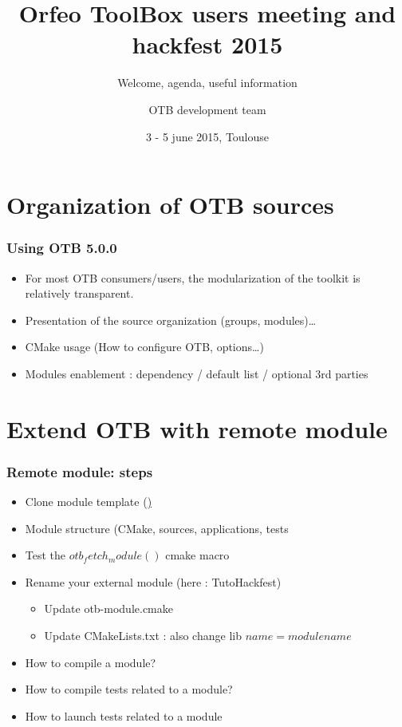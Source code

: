\documentclass[8pt]{beamer}
\title{Orfeo ToolBox users meeting and hackfest 2015}
\subtitle{Welcome, agenda, useful information}
\author{OTB development team}%
\date{3 - 5 june 2015, Toulouse}
\begin{document}
\begin{frame}
\titlepage
\end{frame}

\section{Organization of OTB sources} 
\begin{frame}
\frametitle{Using OTB 5.0.0}

\begin{itemize}
\item For most OTB consumers/users, the modularization of the toolkit is relatively transparent. 
\item Presentation of the source organization (groups, modules)\ldots
\item CMake usage (How to configure OTB, options\ldots)
\item Modules enablement : dependency / default list / optional 3rd parties
\end{itemize}

\end{frame}

\section{Extend OTB with remote module} 

\begin{frame}
\frametitle{Remote module: steps}
\begin{itemize}
\item Clone module template (\href{https://github.com/orfeotoolbox/otbExternalModuleTemplate.git})
\item Module structure (CMake, sources, applications, tests
\item Test the $otb_fetch_module()$ cmake macro
\item Rename your external module (here : TutoHackfest)
  \begin{itemize}
  \item Update otb-module.cmake
  \item Update CMakeLists.txt : also change lib $name = module name$
  \end{itemize}
\item How to compile a module?
\item How to compile tests related to a module?
\item How to launch tests related to a module
\end{itemize}

\end{frame}
\end{document}
